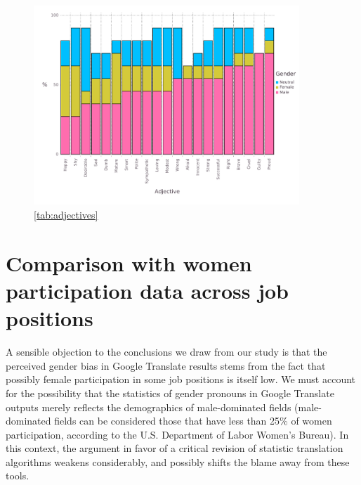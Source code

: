 \documentclass[fleqn,10pt]{article}
\begin{document}
\begin{figure}[H]
	\centering
	\includegraphics[width=10cm]{pictures/barplot-adjectives}
	\caption{ \ref{tab:adjectives} }
	\label{fig:barplot-adjectives}
\end{figure}

\section{Comparison with women participation data across job positions}\label{sec:comparison-women-participation}

A sensible objection to the conclusions we draw from our study is that the perceived gender bias in Google Translate results stems from the fact that possibly female participation in some job positions is itself low. We must account for the possibility that the statistics of gender pronouns in Google Translate outputs merely reflects the demographics of male-dominated fields (male-dominated fields can be considered those that have less than 25\% of women participation\citep{WB2014}, according to the U.S. Department of Labor Women's Bureau). In this context, the argument in favor of a critical revision of statistic translation algorithms weakens considerably, and possibly shifts the blame away from these tools.
\end{document}
